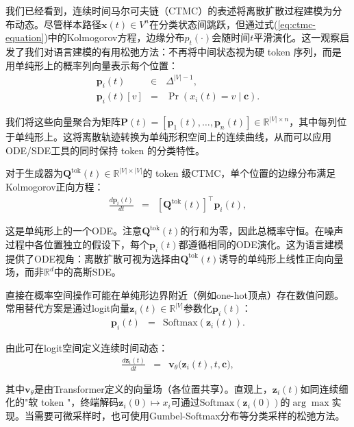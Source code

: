 我们已经看到，连续时间马尔可夫链（CTMC）的表述将离散扩散过程建模为分布动态。尽管样本路径$\mathbf{x}(t)\in V^n$在分类状态间跳跃，但通过式(\ref{eq:ctmc-equation})中的Kolmogorov方程，边缘分布$p_t(\cdot)$会随时间$t$平滑演化。这一观察启发了我们对语言建模的有用松弛方法：不再将中间状态视为硬 token 序列，而是用单纯形上的概率列向量表示每个位置：
\begin{eqnarray}
\mathbf{p}_i(t) & \in & \Delta^{|V|-1}, \\
\mathbf{p}_i(t)[v] & = & \Pr(x_i(t)=v \mid \mathbf{c}).
\end{eqnarray}

\noindent 我们将这些向量聚合为矩阵$\mathbf{P}(t) = [\mathbf{p}_1(t), \dots, \mathbf{p}_n(t)] \in \mathbb{R}^{|V| \times n}$，其中每列位于单纯形上。这将离散轨迹转换为单纯形积空间上的连续曲线，从而可以应用ODE/SDE工具的同时保持 token 的分类特性。

对于生成器为$\mathbf{Q}^{\mathrm{tok}}(t) \in \mathbb{R}^{|V| \times |V|}$的 token 级CTMC，单个位置的边缘分布满足Kolmogorov正向方程：
\begin{eqnarray}
\frac{d \mathbf{p}_i(t)}{dt} & = & \left[ \mathbf{Q}^{\mathrm{tok}}(t) \right]^\top \mathbf{p}_i(t),
\label{eq:simplex-forward-ode}
\end{eqnarray}

\noindent 这是单纯形上的一个ODE。注意$\mathbf{Q}^{\mathrm{tok}}(t)$的行和为零，因此总概率守恒。在噪声过程中各位置独立的假设下，每个$\mathbf{p}_i(t)$都遵循相同的ODE演化。这为语言建模提供了ODE视角：离散扩散可视为选择由$\mathbf{Q}^{\mathrm{tok}}(t)$诱导的单纯形上线性正向向量场，而非$\mathbb{R}^d$中的高斯SDE。

直接在概率空间操作可能在单纯形边界附近（例如one-hot顶点）存在数值问题。常用替代方案是通过logit向量$\mathbf{z}_i(t)\in\mathbb{R}^{|V|}$参数化$\mathbf{p}_i(t)$：
\begin{eqnarray}
\mathbf{p}_i(t) & = &\mathrm{Softmax}(\mathbf{z}_i(t)).
\end{eqnarray}

\noindent 由此可在logit空间定义连续时间动态：
\begin{eqnarray}
\frac{d \mathbf{z}_i(t)}{dt} & = & \mathbf{v}_{\theta} \big(\mathbf{z}_i(t),t,\mathbf{c}\big),
\label{eq:logit-ode}
\end{eqnarray}

\noindent 其中$\mathbf{v}_{\theta}$是由Transformer定义的向量场（各位置共享）。直观上，$\mathbf{z}_i(t)$如同连续细化的"软 token "，终端解码$\mathbf{z}_i(0)\mapsto x_i$可通过$\mathrm{Softmax}(\mathbf{z}_i(0))$的$\arg\max$实现。当需要可微采样时，也可使用Gumbel-Softmax分布等分类采样的松弛方法\citep{jang-etal:2017categorical,maddison-etal:2017the}。

